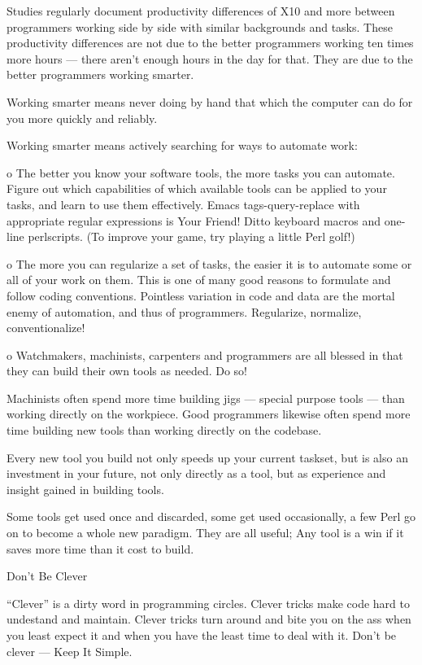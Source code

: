 Studies regularly document productivity differences of X10 and more between 
programmers working side by side with similar backgrounds and tasks.  These 
productivity differences are not due to the better programmers working ten times 
more hours  --- there aren't enough hours in the day for that.  They are due to the 
better programmers working smarter.

Working smarter means never doing by hand that which the computer can do for you 
more quickly and reliably.

Working smarter means actively searching for ways to automate work:

 o The better you know your software tools, the more tasks you 
   can automate.  Figure out which capabilities of which available 
   tools can be applied to your tasks, and learn to use them 
   effectively.  Emacs tags-query-replace with appropriate regular 
   expressions is Your Friend!  Ditto keyboard macros and one-line 
   perlscripts.  (To improve your game, try playing a little Perl golf!)

 o The more you can regularize a set of tasks, the easier it is to 
   automate some or all of your work on them.  This is one of many 
   good reasons to formulate and follow coding conventions. Pointless 
   variation in code and data are the mortal enemy of automation, and 
   thus of programmers.  Regularize, normalize, conventionalize!

 o Watchmakers, machinists, carpenters and programmers are all blessed 
   in that they can build their own tools as needed.  Do so!

   Machinists often spend more time building jigs  --- special purpose 
   tools  --- than  working directly on the workpiece.  Good programmers 
   likewise often spend more time building new tools than working directly 
   on the codebase.

   Every new tool you build not only speeds up your current taskset, but 
   is also an investment in your future, not only directly as a tool, but 
   as experience and insight gained in building tools.

   Some tools get used once and discarded, some get used occasionally, a 
   few Perl go on to become a whole new paradigm.  They are all useful; 
   Any tool is a win if it saves more time than it cost to build.




Don't Be Clever 

``Clever'' is a dirty word in programming circles.  Clever tricks 
make code hard to undestand and maintain.  Clever tricks turn around 
and bite you on the ass when you least expect it and when you have the 
least time to deal with it.  Don't be clever  --- Keep It Simple.


